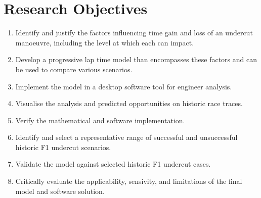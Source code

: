 \section{Research Objectives}
\label{sec:research-objectives}

%
%

\begin{enumerate}
    \item Identify and justify the factors influencing time gain and loss of an undercut manoeuvre, including the level at which each can impact.
    \item Develop a progressive lap time model than encompasses these factors and can be used to compare various scenarios.
    \item Implement the model in a desktop software tool for engineer analysis.
    \item Visualise the analysis and predicted opportunities on historic race traces.
    \item Verify the mathematical and software implementation.
    \item Identify and select a representative range of successful and unsuccessful historic F1 undercut scenarios.
    \item Validate the model against selected historic F1 undercut cases.
    \item Critically evaluate the applicability, sensivity, and limitations of the final model and software solution.
\end{enumerate}

